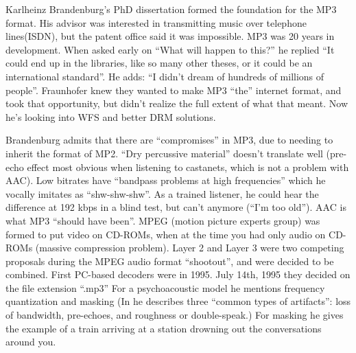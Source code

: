 \documentclass{thesis}
\begin{document}
Karlheinz Brandenburg's PhD dissertation formed the foundation for the MP3 format. His advisor was interested in transmitting music over telephone lines(ISDN), but the patent office said it was impossible. MP3 was 20 years in development. When asked early on ``What will happen to this?'' he replied ``It could end up in the libraries, like so many other theses, or it could be an international standard''. He adds: ``I didn't dream of hundreds of millions of people''. Fraunhofer knew they wanted to make MP3 ``the'' internet format, and took that opportunity, but didn't realize the full extent of what that meant. Now he's looking into WFS and better DRM solutions.\cite{brandenburg_interviews_2004}
	
Brandenburg admits that there are ``compromises'' in MP3, due to needing to inherit the format of MP2. ``Dry percussive material'' doesn't translate well (pre-echo effect most obvious when listening to castanets, which is not a problem with AAC). Low bitrates have ``bandpass problems at high frequencies'' which he vocally imitates as ``shw-shw-shw''. As a trained listener, he could hear the difference at 192 kbps in a blind test, but can't anymore (``I'm too old''). AAC is what MP3 ``should have been''. MPEG (motion picture experts group) was formed to put video on CD-ROMs, when at the time you had only audio on CD-ROMs (massive compression problem). Layer 2 and Layer 3 were two competing proposals during the MPEG audio format ``shootout'', and were decided to be combined. First PC-based decoders were in 1995. July 14th, 1995 they decided on the file extension ``.mp3'' For a psychoacoustic model he mentions frequency quantization and masking (In \cite{karlheinz_brandenburg_mp3_1999} he describes three ``common types of artifacts'': loss of bandwidth, pre-echoes, and roughness or double-speak.) For masking he gives the example of a train arriving at a station drowning out the conversations around you.
\end{document}
